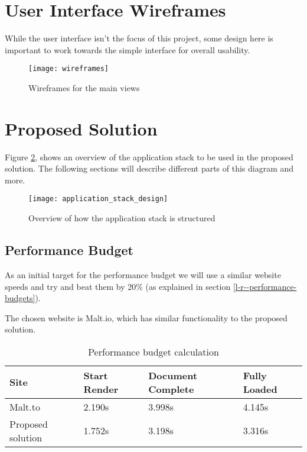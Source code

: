 \section{User Interface Wireframes}

While the user interface isn't the focus of this project, some design here is important to work towards the simple interface for overall usability.

\begin{figure}[H]
  \centering
    \texttt{[image: wireframes]}
  \caption{Wireframes for the main views}
  \label{figure-wireframes}
\end{figure}

\section{Proposed Solution} \label{a-d--proposed-solution}

Figure \ref{figure-application-stack-design}, shows an overview of the application stack to be used in the proposed solution. The following sections will describe different parts of this diagram and more.

\begin{figure}[H]
  \centering
    \texttt{[image: application\_stack\_design]}
  \caption{Overview of how the application stack is structured}
  \label{figure-application-stack-design}
\end{figure}

\subsection{Performance Budget}

As an initial target for the performance budget we will use a similar website speeds and try and beat them by 20\% (as explained in section \ref{l-r--performance-budgets}).

The chosen website is Malt.io, which has similar functionality to the proposed solution.

\begin{table}[H]
\centering
\begin{tabular}{|l|l|l|l|}
\hline
\textbf{Site}     & \textbf{Start Render} & \textbf{Document Complete} & \textbf{Fully Loaded} \\ \hline
Malt.to           & 2.190s                & 3.998s                     & 4.145s                \\ \hline
Proposed solution & 1.752s                & 3.198s                     & 3.316s                \\ \hline
\end{tabular}
\caption{Performance budget calculation}
\label{table-performance-budget}
\end{table}

